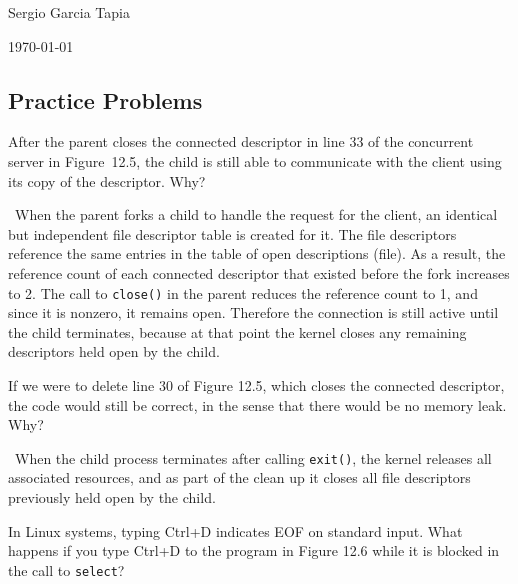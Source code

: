 \documentclass[12pt]{article}
\newenvironment{ex}[2][Exercise]{\begin{trivlist}
		\item[\hskip \labelsep {\bfseries #1}\hskip \labelsep {\bfseries #2.}]}{\end{trivlist}}
\newenvironment{sol}[1][Solution]{\begin{trivlist}
		\item[\hskip \labelsep {\bfseries #1:}]}{\end{trivlist}}
\begin{document}

\noindent Sergio Garcia Tapia \hfill

 \hfill


\noindent\today

\subsection*{Practice Problems}

\begin{ex}{12.1}
	After the parent closes the connected descriptor in line 33 of the concurrent server in
	Figure~12.5, the child is still able to communicate with the client using its copy of the
	descriptor. Why?
\end{ex}

\begin{sol}
	\
	When the parent forks a child to handle the request for the client, an identical but independent
	file descriptor table is created for it. The file descriptors reference the same entries in
	the table of open descriptions (file). As a result, the reference count of each connected
	descriptor that existed before the fork increases to 2. The call to \texttt{close()} in
	the parent reduces the reference count to 1, and since it is nonzero, it remains open.
	Therefore the connection is still active until the child terminates, because at that point
	the kernel closes any remaining descriptors held open by the child.
\end{sol}

\begin{ex}{12.2}
	If we were to delete line 30 of Figure 12.5, which closes the connected descriptor, the code
	would still be correct, in the sense that there would be no memory leak. Why?
\end{ex}

\begin{sol}
	\
	When the child process terminates after calling \texttt{exit()}, the kernel releases all
	associated resources, and as part of the clean up it closes all file descriptors previously
	held open by the child.
\end{sol}

\begin{ex}{12.3}
	In Linux systems, typing Ctrl+D indicates EOF on standard input. What happens if you type
	Ctrl+D to the program in Figure 12.6 while it is blocked in the call to \texttt{select}?
\end{ex}
\end{document}
